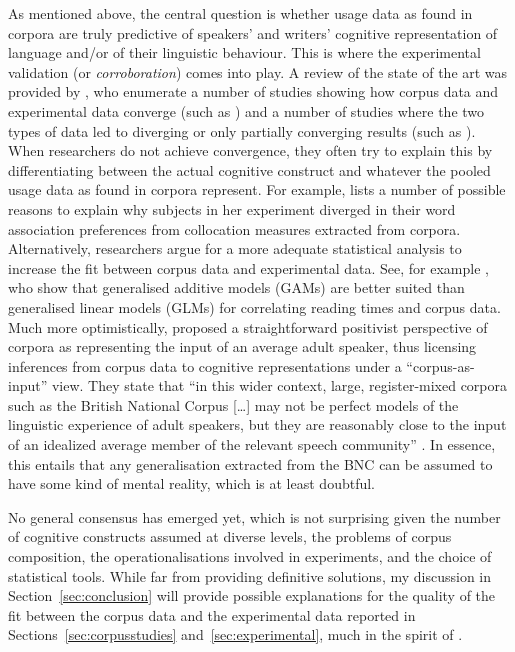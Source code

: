 As mentioned above, the central question is whether usage data as found in corpora are truly predictive of speakers' and writers' cognitive representation of language and\slash or of their linguistic behaviour.
This is where the experimental validation (or \textit{corroboration}) comes into play.
A review of the state of the art was provided by \cite{NewmanSorensenduncan2015}, who enumerate a number of studies showing how corpus data and experimental data converge (such as \citealp{BresnanEa2007,DurrantDoherty2010,GriesWulff2005,GriesEa2005}) and a number of studies where the two types of data led to diverging or only partially converging results (such as \citealp{ArppeJaervikivi2007,Dabrowska2014,Mollin2009}).
When researchers do not achieve convergence, they often try to explain this by differentiating between the actual cognitive construct and whatever the pooled usage data as found in corpora represent.
For example, \citet[411]{Dabrowska2014} lists a number of possible reasons to explain why subjects in her experiment diverged in their word association preferences from collocation measures extracted from corpora.
Alternatively, researchers argue for a more adequate statistical analysis to increase the fit between corpus data and experimental data.
See, for example \cite{DivjakEa2016}, who show that generalised additive models (GAMs) are better suited than generalised linear models (GLMs) for correlating reading times and corpus data. 
Much more optimistically, \cite{StefanowitschFlach2016} proposed a straightforward positivist perspective of corpora as representing the input of an average adult speaker, thus licensing inferences from corpus data to cognitive representations under a ``corpus-as-input'' view.
They state that ``in this wider context, large, register-mixed corpora such as the British National Corpus [\ldots] may not be perfect models of the linguistic experience of adult speakers, but they are reasonably close to the input of an idealized average member of the relevant speech community'' \citep[104]{StefanowitschFlach2016}.
In essence, this entails that any generalisation extracted from the BNC can be assumed to have some kind of mental reality, which is at least doubtful.

No general consensus has emerged yet, which is not surprising given the number of cognitive constructs assumed at diverse levels, the problems of corpus composition, the operationalisations involved in experiments, and the choice of statistical tools.
While far from providing definitive solutions, my discussion in Section~\ref{sec:conclusion} will provide possible explanations for the quality of the fit between the corpus data and the experimental data reported in Sections~\ref{sec:corpusstudies} and~\ref{sec:experimental}, much in the spirit of \citet{Dabrowska2014}.

